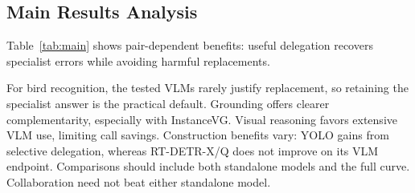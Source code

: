 \subsection{Main Results Analysis}
Table~\ref{tab:main} shows pair-dependent benefits: useful delegation recovers specialist errors while avoiding harmful replacements.

For bird recognition, the tested VLMs rarely justify replacement, so retaining the specialist answer is the practical default. Grounding offers clearer complementarity, especially with InstanceVG. Visual reasoning favors extensive VLM use, limiting call savings. Construction benefits vary: YOLO gains from selective delegation, whereas RT-DETR-X/Q does not improve on its VLM endpoint. Comparisons should include both standalone models and the full curve. Collaboration need not beat either standalone model.
